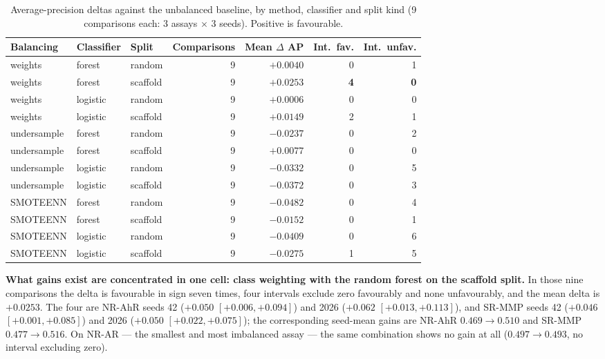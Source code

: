 \documentclass[10pt,letterpaper]{article}
\newcommand{\dd}{$\Delta$}
\begin{document}
\begin{table}[!htbp]
\centering
\small
\caption{Average-precision deltas against the unbalanced baseline, by method, classifier and split
kind (9 comparisons each: 3 assays $\times$ 3 seeds). Positive is favourable.}
\label{tab:apcell}
\begin{tabular}{@{}lllrrrr@{}}
\toprule
Balancing & Classifier & Split & Comparisons & Mean \dd{} AP & Int.\ fav. & Int.\ unfav. \\
\midrule
weights & forest   & random   & 9 & $+0.0040$ & 0 & 1 \\
weights & forest   & scaffold & 9 & $\mathbf{+0.0253}$ & \textbf{4} & \textbf{0} \\
weights & logistic & random   & 9 & $+0.0006$ & 0 & 0 \\
weights & logistic & scaffold & 9 & $+0.0149$ & 2 & 1 \\
\midrule
undersample & forest   & random   & 9 & $-0.0237$ & 0 & 2 \\
undersample & forest   & scaffold & 9 & $+0.0077$ & 0 & 0 \\
undersample & logistic & random   & 9 & $-0.0332$ & 0 & 5 \\
undersample & logistic & scaffold & 9 & $-0.0372$ & 0 & 3 \\
\midrule
SMOTEENN & forest   & random   & 9 & $-0.0482$ & 0 & 4 \\
SMOTEENN & forest   & scaffold & 9 & $-0.0152$ & 0 & 1 \\
SMOTEENN & logistic & random   & 9 & $-0.0409$ & 0 & 6 \\
SMOTEENN & logistic & scaffold & 9 & $-0.0275$ & 1 & 5 \\
\bottomrule
\end{tabular}
\end{table}

\textbf{What gains exist are concentrated in one cell: class weighting with the random forest on the
scaffold split.} In those nine comparisons the delta is favourable in sign seven times, four
intervals exclude zero favourably and none unfavourably, and the mean delta is $+0.0253$. The four
are NR-AhR seeds 42 ($+0.050$ $[+0.006,+0.094]$) and 2026 ($+0.062$ $[+0.013,+0.113]$), and SR-MMP
seeds 42 ($+0.046$ $[+0.001,+0.085]$) and 2026 ($+0.050$ $[+0.022,+0.075]$); the corresponding
seed-mean gains are NR-AhR $0.469\to0.510$ and SR-MMP $0.477\to0.516$. On NR-AR --- the smallest and
most imbalanced assay --- the same combination shows no gain at all ($0.497\to0.493$, no interval
excluding zero).
\end{document}
